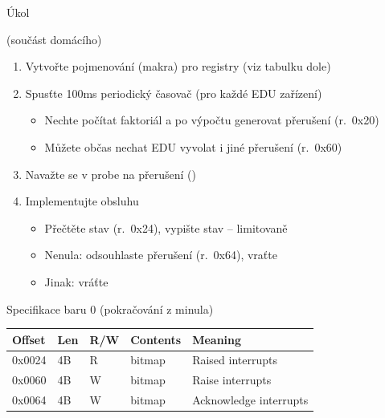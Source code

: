 \begin{frame}{Úkol}

   \iffimuni (součást domácího) \fi
  \begin{enumerate}
    \item Vytvořte pojmenování (makra) pro registry (viz tabulku dole)

    \item Spusťte 100ms periodický časovač (pro každé EDU zařízení)
    \begin{itemize}
      \item Nechte počítat faktoriál a po výpočtu generovat přerušení (r.\ 0x20)
      \item Můžete občas nechat EDU vyvolat i jiné přerušení (r.\ 0x60)
    \end{itemize}

    \item Navažte se v probe na přerušení ()

    \item Implementujte obsluhu
    \begin{itemize}
      \item Přečtěte stav (r.\ 0x24), vypište stav -- limitovaně
      \item Nenula: odsouhlaste přerušení (r.\ 0x64), vraťte 
      \item Jinak: vráťte 
    \end{itemize}
  \end{enumerate}

\begin{block}{Specifikace baru 0 (pokračování z minula)}
\footnotesize
\begin{center}
\begin{tabular}{|l|l|l|l|l|} \hline
Offset & Len & R/W & Contents   & Meaning \\ \hline\hline
0x0024 & 4B  & R   & bitmap & Raised interrupts \\ \hline
0x0060 & 4B  & W   & bitmap & Raise interrupts \\ \hline
0x0064 & 4B  & W   & bitmap & Acknowledge interrupts \\ \hline
\end{tabular}
\end{center}
\end{block}

\end{frame}
